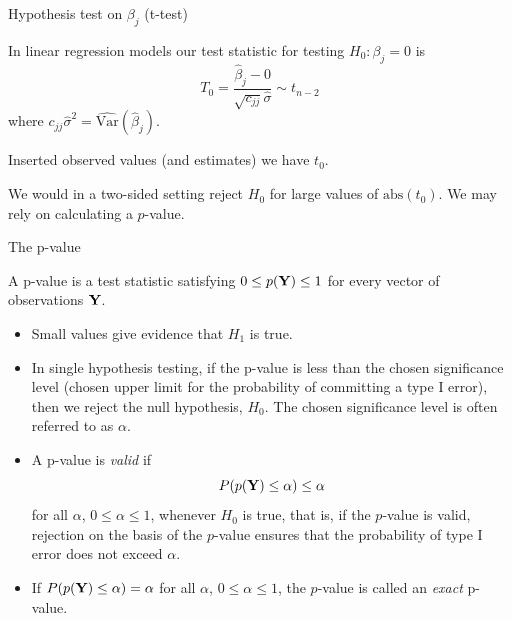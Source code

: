 \documentclass[10pt,ignorenonframetext,]{beamer}
\begin{document}
\begin{frame}

\begin{block}{Hypothesis test on \(\beta_j\) (t-test)}

In linear regression models our test statistic for testing
\(H_0: \beta_j=0\) is
\[T_0=\frac{\hat{\beta}_j-0}{\sqrt{c_{jj}}\hat{\sigma}}\sim t_{n-2}\]
where \(c_{jj}\hat{\sigma}^2=\widehat{\text{Var}}(\hat{\beta}_j)\).

Inserted observed values (and estimates) we have \(t_0\).

We would in a two-sided setting reject \(H_0\) for large values of
\(\text{abs}(t_0)\). We may rely on calculating a \(p\)-value.

\end{block}

\end{frame}

\begin{frame}

\begin{block}{The p-value}

A p-value is a test statistic satisfying \(0 \leq p({\bf Y}) \leq 1\)
for every vector of observations \({\bf Y}\).

\begin{itemize}
\item
  Small values give evidence that \(H_1\) is true.
\item
  In single hypothesis testing, if the p-value is less than the chosen
  significance level (chosen upper limit for the probability of
  committing a type I error), then we reject the null hypothesis,
  \(H_0\). The chosen significance level is often referred to as
  \(\alpha\).
\item
  A p-value is \emph{valid} if
  \[ P(p({\bf Y}) \leq \alpha) \leq \alpha\] for all \(\alpha\),
  \(0 \leq \alpha \leq 1\), whenever \(H_0\) is true, that is, if the
  \(p\)-value is valid, rejection on the basis of the \(p\)-value
  ensures that the probability of type I error does not exceed
  \(\alpha\).
\item
  If \(P(p({\bf Y}) \leq \alpha) = \alpha\) for all \(\alpha\),
  \(0 \leq \alpha \leq 1\), the \(p\)-value is called an \emph{exact}
  p-value.
\end{itemize}

\end{block}

\end{frame}
\end{document}
